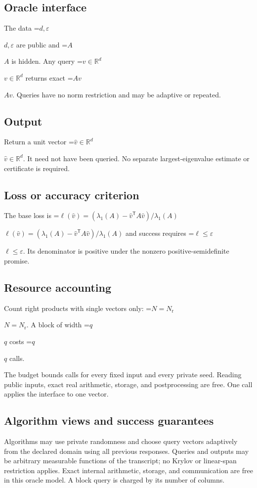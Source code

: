 \documentclass[10pt,a4paper]{article}
\newcommand{\AtlasMath}[1]{\par\begingroup\centering\setbox0=\hbox{$\displaystyle #1$}\ifdim\wd0>1.4\linewidth\typeout{ATLAS WIDE FORMULA: \the\wd0}\fi\ifdim\wd0>\linewidth\resizebox{\linewidth}{!}{\box0}\else\box0\fi\par\endgroup}
\newcommand{\AtlasInlineMath}[1]{\begingroup\setbox0=\hbox{$#1$}\ifdim\wd0>.4\linewidth\endgroup\AtlasMath{#1}\else\endgroup$#1$\fi}
\begin{document}
\subsection{Oracle interface}
The data \AtlasInlineMath{d,\varepsilon} are public and \AtlasInlineMath{A} is hidden. Any query \AtlasInlineMath{v\in\mathbb{R}^d} returns exact \AtlasInlineMath{Av}. Queries have no norm restriction and may be adaptive or repeated.

\subsection{Output}
Return a unit vector \AtlasInlineMath{\widehat v\in\mathbb R^d}. It need not have been queried. No separate largest-eigenvalue estimate or certificate is required.

\subsection{Loss or accuracy criterion}
The base loss is \AtlasInlineMath{\ell(\widehat{v})=(\lambda_1(A)-\widehat{v}^{\mathsf T}A\widehat{v})/\lambda_1(A)} and success requires \AtlasInlineMath{\ell\le\varepsilon}. Its denominator is positive under the nonzero positive-semidefinite promise.

\subsection{Resource accounting}
Count right products with single vectors only: \AtlasInlineMath{N=N_{\mathrm r}}. A block of width \AtlasInlineMath{q} costs \AtlasInlineMath{q} calls.

The budget bounds calls for every fixed input and every private seed. Reading public inputs, exact real arithmetic, storage, and postprocessing are free. One call applies the interface to one vector.

\subsection{Algorithm views and success guarantees}
Algorithms may use private randomness and choose query vectors adaptively from the declared domain using all previous responses. Queries and outputs may be arbitrary measurable functions of the transcript; no Krylov or linear-span restriction applies. Exact internal arithmetic, storage, and communication are free in this oracle model. A block query is charged by its number of columns.
\end{document}
